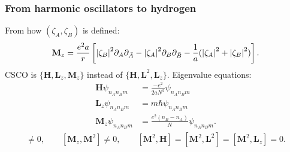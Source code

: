 \documentclass{beamer}
\theoremstyle{definition}
\newcommand{\lb}{\left[}
\newcommand{\rb}{\right]}
\newcommand{\p}{\partial}
\newcommand{\f}[2]{\frac{#1}{#2}}
\begin{document}
\begin{frame}
\frametitle{From harmonic oscillators to hydrogen}
From how $(\zeta_A, \zeta_B)$ is defined:
\begin{align*}
\mathbf{M}_z = \f{e^2a}{r} 
\lb  
\abs{\zeta_B}^2 \p_A \p_{\bar{A}}  
- \abs{\zeta_A}^2 \p_B \p_{\bar{B}} 
-  \f{1}{a} ( \abs{\zeta_A}^2 + \abs{\zeta_B}^2) 
\rb.
\end{align*} 
\pause 
CSCO is $\{ \mathbf{H}, \mathbf{L}_z, \mathbf{M}_z \}$ instead of $\{ \mathbf{H}, \mathbf{L}^2 , \mathbf{L}_z \}$. Eigenvalue equations:
\begin{align*}
\mathbf{H} \psi_{n_A n_B m} &= \f{-e^2}{2aN^2} \psi_{n_A n_B m} \\
\mathbf{L}_z \psi_{n_A n_B m} &= m \hbar \psi_{n_A n_B m}\\
\mathbf{M}_z \psi_{n_A n_B m} &= \f{e^2 (n_B - n_A)}{N}  \psi_{n_A n_B m}.
\end{align*}
\pause
\vspace{-10pt}
\begin{align*}
[\mathbf{M}_z, \mathbf{L}^2] \neq 0, 
\quad\quad 
[\mathbf{M}_z, \mathbf{M}^2] \neq 0, 
\quad\quad 
[\mathbf{M}^2, \mathbf{H}] = [\mathbf{M}^2, \mathbf{L}^2] = [\mathbf{M}^2, \mathbf{L}_z] = 0.
\end{align*}
\end{frame}
\end{document}
